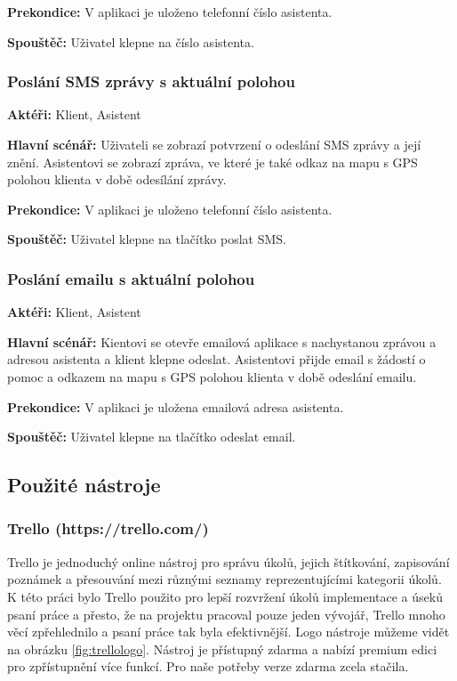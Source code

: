 \documentclass{article}
\newcommand{\usecase}[2]{\subsubsection{#1}\label{#2}}
\begin{document}
\vspace{0.1cm}
\noindent
\textbf{Prekondice:} V aplikaci je uloženo telefonní číslo asistenta.

\vspace{0.1cm}
\noindent
\textbf{Spouštěč:} Uživatel klepne na číslo asistenta.

\usecase{Poslání SMS zprávy s aktuální polohou}{pomocsms}
\textbf{Aktéři:} Klient, Asistent

\vspace{0.1cm}
\noindent
\textbf{Hlavní scénář:} Uživateli se zobrazí potvrzení o odeslání SMS zprávy a její znění.
Asistentovi se zobrazí zpráva, ve které je také odkaz na mapu s GPS polohou klienta v době odesílání zprávy.

\vspace{0.1cm}
\noindent
\textbf{Prekondice:} V aplikaci je uloženo telefonní číslo asistenta.

\vspace{0.1cm}
\noindent
\textbf{Spouštěč:} Uživatel klepne na tlačítko poslat SMS.


\usecase{Poslání emailu s aktuální polohou}{pomocemail}
\textbf{Aktéři:} Klient, Asistent

\vspace{0.1cm}
\noindent
\textbf{Hlavní scénář:} Kientovi se otevře emailová aplikace s nachystanou zprávou a adresou asistenta
a klient klepne odeslat. Asistentovi přijde email s žádostí o pomoc a odkazem na mapu s GPS polohou
klienta v době odeslání emailu.

\vspace{0.1cm}
\noindent
\textbf{Prekondice:} V aplikaci je uložena emailová adresa asistenta.

\vspace{0.1cm}
\noindent
\textbf{Spouštěč:} Uživatel klepne na tlačítko odeslat email.









\subsection{Použité nástroje}
\subsubsection{Trello (https://trello.com/)}
Trello je jednoduchý online nástroj pro správu úkolů, jejich štítkování, zapisování poznámek a přesouvání
mezi různými seznamy reprezentujícími kategorii úkolů. K této práci bylo Trello použito pro lepší
rozvržení úkolů implementace a úseků psaní práce a přesto, že na projektu pracoval pouze jeden vývojář,
Trello mnoho věcí zpřehlednilo a psaní práce tak byla efektivnější. Logo nástroje můžeme vidět
na obrázku \ref{fig:trellologo}. Nástroj je přístupný zdarma a nabízí premium edici pro zpřístupnění
více funkcí. Pro naše potřeby verze zdarma zcela stačila.
\end{document}
